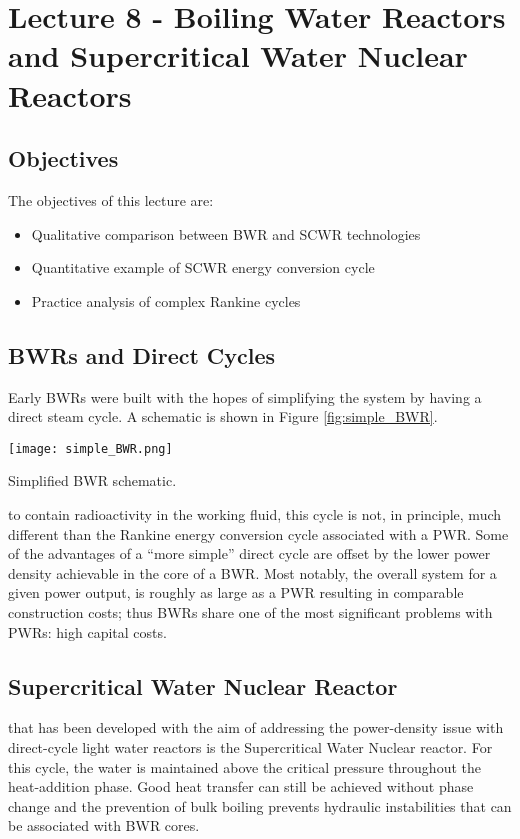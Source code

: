 \chapter{Lecture 8 - Boiling Water Reactors and Supercritical Water Nuclear Reactors}
\label{ch:ch8}
\section{Objectives}
The objectives of this lecture are:
\begin{itemize}
\item Qualitative comparison between BWR and SCWR technologies
\item Quantitative example of SCWR energy conversion cycle
\item Practice analysis of complex Rankine cycles
\end{itemize}

\section{BWRs and Direct Cycles}
Early BWRs were built with the hopes of simplifying the system by having a direct steam cycle.  A schematic is shown in Figure \ref{fig:simple_BWR}.  
\begin{marginfigure}
\texttt{[image: simple\_BWR.png]}
\caption{Simplified BWR schematic.}
\label{fig:simple_BWR}
\end{marginfigure}
 to contain radioactivity in the working fluid, this cycle is not, in principle, much different than the Rankine energy conversion cycle associated with a PWR.  Some of the advantages of a ``more simple'' direct cycle are offset by the lower power density achievable in the core of a BWR.  Most notably, the overall system for a given power output, is roughly as large as a PWR resulting in comparable construction costs; thus BWRs share one of the most significant problems with PWRs: high capital costs.

\section{Supercritical Water Nuclear Reactor}
 that has been developed with the aim of addressing the power-density issue with direct-cycle light water reactors is the Supercritical Water Nuclear reactor.\cite{tsiklauri2005supercritical} For this cycle, the water is maintained above the critical pressure throughout the heat-addition phase.  Good heat transfer can still be achieved without phase change and the prevention of bulk boiling prevents hydraulic instabilities that can be associated with BWR cores.  

